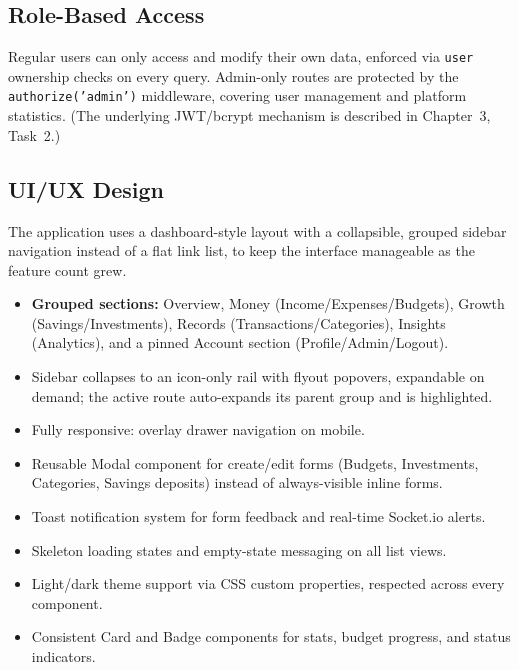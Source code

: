 \documentclass[11pt,a4paper]{report}
\begin{document}
\subsection{Role-Based Access}
Regular users can only access and modify their own data, enforced via
\texttt{user} ownership checks on every query. Admin-only routes are protected by
the \texttt{authorize('admin')} middleware, covering user management and
platform statistics. (The underlying JWT/bcrypt mechanism is described in
Chapter~3, Task~2.)

\subsection{UI/UX Design}
The application uses a dashboard-style layout with a collapsible, grouped sidebar
navigation instead of a flat link list, to keep the interface manageable as the
feature count grew.
\begin{itemize}[leftmargin=1.4em]
  \item \textbf{Grouped sections:} Overview, Money (Income/Expenses/Budgets),
        Growth (Savings/Investments), Records (Transactions/Categories), Insights
        (Analytics), and a pinned Account section (Profile/Admin/Logout).
  \item Sidebar collapses to an icon-only rail with flyout popovers, expandable on
        demand; the active route auto-expands its parent group and is highlighted.
  \item Fully responsive: overlay drawer navigation on mobile.
  \item Reusable Modal component for create/edit forms (Budgets, Investments,
        Categories, Savings deposits) instead of always-visible inline forms.
  \item Toast notification system for form feedback and real-time Socket.io
        alerts.
  \item Skeleton loading states and empty-state messaging on all list views.
  \item Light/dark theme support via CSS custom properties, respected across every
        component.
  \item Consistent Card and Badge components for stats, budget progress, and
        status indicators.
\end{itemize}
\end{document}
